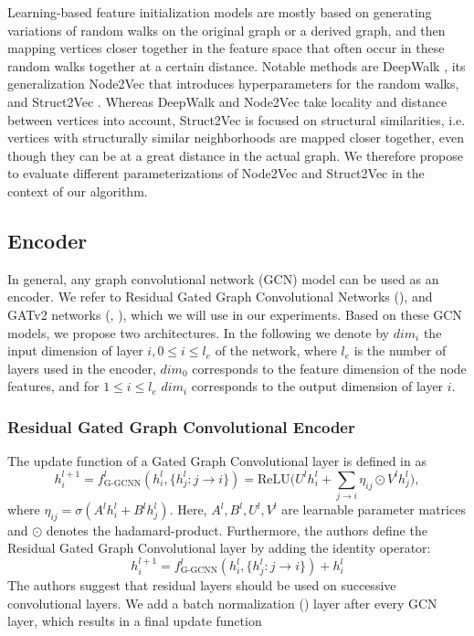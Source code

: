 \documentclass[draft,final]{vutinfth} %
\begin{document}
Learning-based feature initialization models are mostly based on generating variations of random walks on the original graph or a derived graph, and then mapping vertices closer together in the feature space that often occur in these random walks together at a certain distance. Notable methods are DeepWalk \cite{Perozzi2014}, its generalization Node2Vec \cite{GroverL16} that introduces hyperparameters for the random walks, and Struct2Vec \cite{FigueiredoRS17}. Whereas DeepWalk and Node2Vec take locality and distance between vertices into account, Struct2Vec is focused on structural similarities, i.e. vertices with structurally similar neighborhoods are mapped closer together, even though they can be at a great distance in the actual graph. We therefore propose to evaluate different parameterizations of Node2Vec and Struct2Vec in the context of our algorithm. 

\subsection{Encoder}
In general, any graph convolutional network (GCN) model can be used as an encoder. We refer to Residual Gated Graph Convolutional Networks (\cite{Bresson2017}), and GATv2 networks (\cite{Velickovic2018}, \cite{Brody2021}), which we will use in our experiments. Based on these GCN models, we propose two architectures. In the following we denote by $dim_i$ the input dimension of layer $i, 0 \leq i \leq l_e$ of the network, where $l_e$ is the number of layers used in the encoder, $dim_0$ corresponds to the feature dimension of the node features, and for $1 \leq i \leq l_e$ $dim_i$ corresponds to the output dimension of layer $i$. 

\subsubsection{Residual Gated Graph Convolutional Encoder}
The update function of a Gated Graph Convolutional layer is defined in \cite{Bresson2017} as 
\[
    h_i^{l+1} = f_{\text{G-GCNN}}^l(h_i^l, \{ h_j^l \colon j \rightarrow i \}) = \text{ReLU} \Big( U^l h_i^l + \sum_{j \rightarrow i} \eta_{ij} \odot V^l h^l_j \Big),
\]
where $\eta_{ij} = \sigma(A^l h_i^l + B^l h_j^l)$. Here, $A^l, B^l, U^l, V^l$ are learnable parameter matrices and $\odot$ denotes the hadamard-product. 
Furthermore, the authors define the Residual Gated Graph Convolutional layer by adding the identity operator: 
\[
    h_i^{l+1} = f_{\text{G-GCNN}}^l(h_i^l, \{ h_j^l \colon j \rightarrow i \}) + h_i^l
\]
The authors suggest that residual layers should be used on successive convolutional layers. 
We add a batch normalization (\cite{IoffeS15}) layer after every GCN layer, which results in a final update function 
\end{document}
